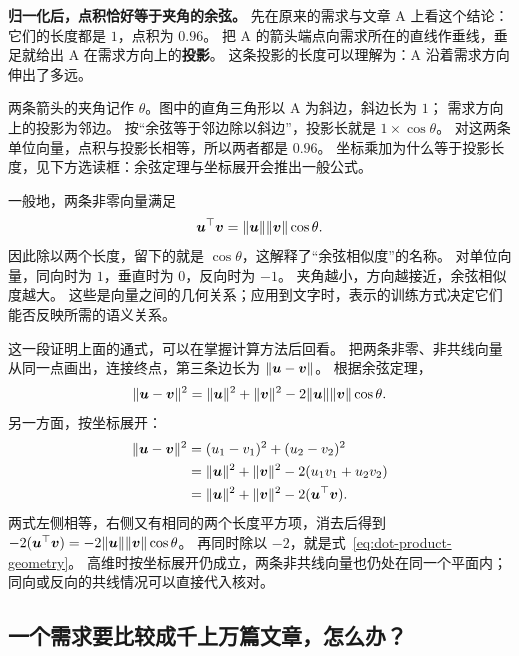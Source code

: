\textbf{归一化后，点积恰好等于夹角的余弦。}
先在原来的需求与文章 A 上看这个结论：它们的长度都是 $1$，点积为 $0.96$。
把 A 的箭头端点向需求所在的直线作垂线，垂足就给出 A 在需求方向上的\textbf{投影}。
这条投影的长度可以理解为：A 沿着需求方向伸出了多远。


两条箭头的夹角记作 $\theta$。图中的直角三角形以 A 为斜边，斜边长为 $1$；
需求方向上的投影为邻边。
按“余弦等于邻边除以斜边”，投影长就是 $1\times\cos\theta$。
对这两条单位向量，点积与投影长相等，所以两者都是 $0.96$。
坐标乘加为什么等于投影长度，见下方选读框：余弦定理与坐标展开会推出一般公式。

一般地，两条非零向量满足
\begin{equation}
\boldsymbol{u}^\top\boldsymbol{v}=\|\boldsymbol{u}\|\|\boldsymbol{v}\|\cos\theta.
\label{eq:dot-product-geometry}
\end{equation}
因此除以两个长度，留下的就是 $\cos\theta$，这解释了“余弦相似度”的名称。
对单位向量，同向时为 $1$，垂直时为 $0$，反向时为 $-1$。
夹角越小，方向越接近，余弦相似度越大。
这些是向量之间的几何关系；应用到文字时，表示的训练方式决定它们能否反映所需的语义关系。

\begin{example}[title={{\symboliconfont ★} 为什么坐标计算与几何解释一致？}]
这一段证明上面的通式，可以在掌握计算方法后回看。
把两条非零、非共线向量从同一点画出，连接终点，第三条边长为 $\|\boldsymbol{u}-\boldsymbol{v}\|$。
根据余弦定理，
\begin{equation}
\|\boldsymbol{u}-\boldsymbol{v}\|^2
=\|\boldsymbol{u}\|^2+\|\boldsymbol{v}\|^2
-2\|\boldsymbol{u}\|\|\boldsymbol{v}\|\cos\theta.
\label{eq:cosine-law}
\end{equation}
另一方面，按坐标展开：
\[\begin{aligned}
\|\boldsymbol{u}-\boldsymbol{v}\|^2
&=(u_1-v_1)^2+(u_2-v_2)^2\\
&=\|\boldsymbol{u}\|^2+\|\boldsymbol{v}\|^2
-2(u_1v_1+u_2v_2)\\
&=\|\boldsymbol{u}\|^2+\|\boldsymbol{v}\|^2-2(\boldsymbol{u}^\top\boldsymbol{v}).
\end{aligned}\]
两式左侧相等，右侧又有相同的两个长度平方项，消去后得到
$-2(\boldsymbol{u}^\top\boldsymbol{v})=-2\|\boldsymbol{u}\|\|\boldsymbol{v}\|\cos\theta$。
再同时除以 $-2$，就是式~\eqref{eq:dot-product-geometry}。
高维时按坐标展开仍成立，两条非共线向量也仍处在同一个平面内；
同向或反向的共线情况可以直接代入核对。
\end{example}

\subsection{一个需求要比较成千上万篇文章，怎么办？}

